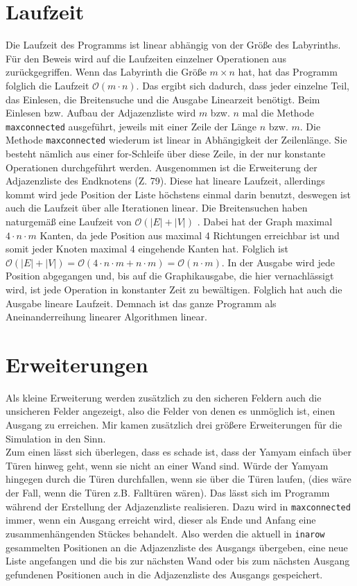 \documentclass[12pt]{article}
\begin{document}
\section{Laufzeit}
Die Laufzeit des Programms ist linear abhängig von der Größe des Labyrinths. Für den Beweis wird auf die Laufzeiten einzelner Operationen aus \cite{1} zurückgegriffen. Wenn das Labyrinth die Größe $m\times n$ hat, hat das Programm folglich die Laufzeit $\mathcal O(m\cdot n)$. Das ergibt sich dadurch, dass jeder einzelne Teil, das Einlesen, die Breitensuche und die Ausgabe Linearzeit benötigt. Beim Einlesen bzw. Aufbau der Adjazenzliste wird $m$ bzw. $n$ mal die Methode \texttt{maxconnected} ausgeführt, jeweils mit einer Zeile der Länge $n$ bzw. $m$. Die Methode \texttt{maxconnected} wiederum ist linear in Abhängigkeit der Zeilenlänge. Sie besteht nämlich aus einer for-Schleife über diese Zeile, in der nur konstante Operationen durchgeführt werden. Ausgenommen ist die Erweiterung der Adjazenzliste des Endknotens (Z. 79). Diese hat lineare Laufzeit, allerdings kommt wird jede Position der Liste höchstens einmal darin benutzt, deswegen ist auch die Laufzeit über alle Iterationen linear. Die Breitensuchen haben naturgemäß eine Laufzeit von $\mathcal{O}(|E| +|V|)$ \cite{2}. Dabei hat der Graph maximal $4\cdot n\cdot m$ Kanten, da jede Position aus maximal 4 Richtungen erreichbar ist und somit jeder Knoten maximal 4 eingehende Kanten hat. Folglich ist $\mathcal{O}(|E|+|V|) = \mathcal{O}(4\cdot n\cdot m + n\cdot m) = \mathcal{O}(n\cdot m)$. In der Ausgabe wird jede Position abgegangen und, bis auf die Graphikausgabe, die hier vernachlässigt wird, ist jede Operation in konstanter Zeit zu bewältigen. Folglich hat auch die Ausgabe lineare Laufzeit. Demnach ist das ganze Programm als Aneinanderreihung linearer Algorithmen linear.

\section{Erweiterungen}
Als kleine Erweiterung werden zusätzlich zu den sicheren Feldern auch die unsicheren Felder angezeigt, also die Felder von denen es unmöglich ist, einen Ausgang zu erreichen. Mir kamen zusätzlich drei größere Erweiterungen für die Simulation in den Sinn.\\

Zum einen lässt sich überlegen, dass es schade ist, dass der Yamyam einfach über Türen hinweg geht, wenn sie nicht an einer Wand sind. Würde der Yamyam hingegen durch die Türen durchfallen, wenn sie über die Türen laufen, (dies wäre der Fall, wenn die Türen z.B. Falltüren wären). Das lässt sich im Programm während der Erstellung der Adjazenzliste realisieren. Dazu wird in \texttt{maxconnected} immer, wenn ein Ausgang erreicht wird, dieser als Ende und Anfang eine zusammenhängenden Stückes behandelt. Also werden die aktuell in \texttt{inarow} gesammelten Positionen an die Adjazenzliste des Ausgangs übergeben, eine neue Liste angefangen und die bis zur nächsten Wand oder bis zum nächsten Ausgang gefundenen Positionen auch in die Adjazenzliste des Ausgangs gespeichert.\\
\end{document}
